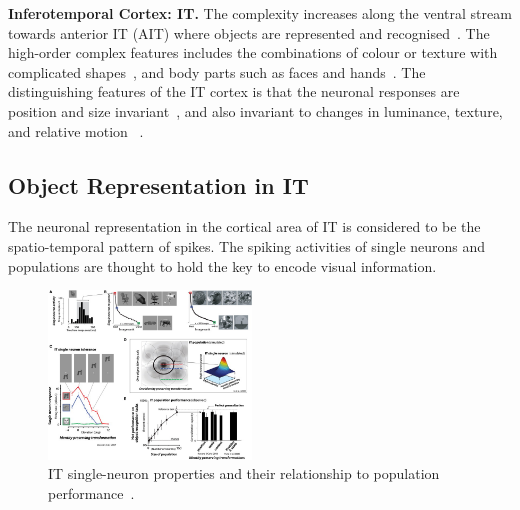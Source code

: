 \documentclass[journal]{journal}
\begin{document}
\textbf{Inferotemporal Cortex: IT.}
The complexity increases along the ventral stream towards anterior IT (AIT) where objects are represented and recognised~\cite{dean1976effects}.
The high-order complex features includes the combinations of colour or texture with complicated shapes~\cite{tanaka1991coding}, and body parts such as faces and hands~\cite{gross2008single}.
The distinguishing features of the IT cortex is that the neuronal responses are position and size invariant~\cite{schwartz1983shape}, and also invariant to changes in luminance, texture, and relative motion ~\cite{sary1993cue}.

\subsection{Object Representation in IT}
The neuronal representation in the cortical area of IT is considered to be the spatio-temporal pattern of spikes.
The spiking activities of single neurons and populations are thought to hold the key to encode visual information.
\begin{figure}
	\centering
	\includegraphics[width=0.48\textwidth]{pics/IT.jpg}
	\caption{	
		IT single-neuron properties and their relationship to population performance~\cite{dicarlo2012does}.
	}
	\label{Fig:IT}
\end{figure}
\end{document}
